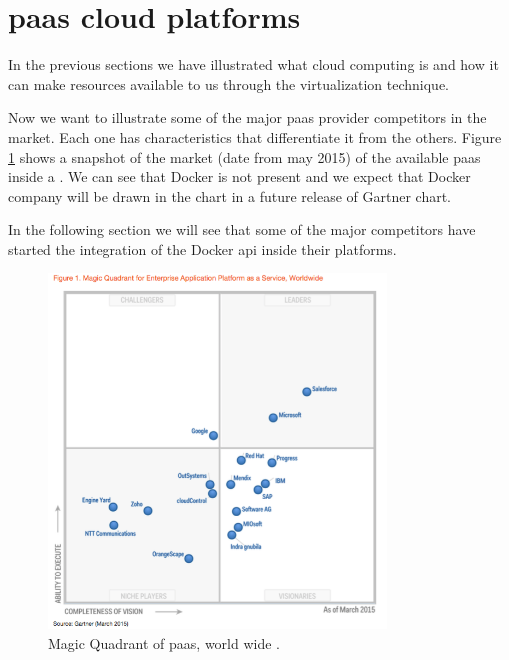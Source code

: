 %
%
\section{\acs{paas} cloud platforms}
\label{sec:problemSpace-cloudPlatform}
In the previous sections we have illustrated what cloud computing is and how it can make resources
available to us through the virtualization technique. 

Now we want to illustrate some of the major \ac{paas} provider competitors in the market. Each one 
has characteristics that differentiate it from the others.
Figure \ref{img:problemSpace-paas-topProviders-gartnerQuadrant} shows a snapshot of the
market (date from may 2015) of the available \ac{paas} inside a . We can see
that Docker is not present and we expect that Docker company will be drawn in the chart in a future
release of Gartner chart.

In the following section we will see that some of the major competitors have started the integration
of the Docker \ac{api} inside their platforms.

\begin{figure}
	\centering{}
	\includegraphics[width=0.8\textwidth]{chapters/problem/images/gartner-2015.png}
	\caption[Ovierviw of \acs{paas} available in 2015]{Magic Quadrant of \acf{paas}, world wide
		\cite{gartnerPaasQuadrant}.}
	\label{img:problemSpace-paas-topProviders-gartnerQuadrant}
\end{figure}

